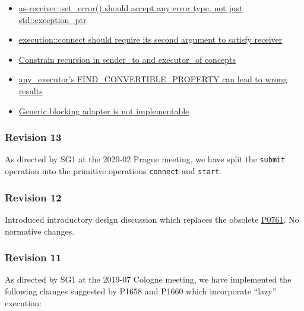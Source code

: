 \documentclass[a4paper,12pt,notitlepage,twoside,openright]{article}
\begin{document}
\begin{itemize}

\item
  \href{https://github.com/executors/executors/issues/462}{as-receiver::set\_error()
  should accept any error type, not just std::exception\_ptr}
\item
  \href{https://github.com/executors/executors/issues/473}{execution::connect
  should require its second argument to satisfy receiver}
\item
  \href{https://github.com/executors/executors/issues/474}{Constrain
  recursion in sender\_to and executor\_of concepts}
\item
  \href{https://github.com/executors/executors/issues/508}{any\_executor's
  FIND\_CONVERTIBLE\_PROPERTY can lead to wrong results}
\item
  \href{https://github.com/executors/executors/issues/512}{Generic
  blocking adapter is not implementable}
\end{itemize}

\hypertarget{revision-13}{%
\subsubsection{Revision 13}\label{revision-13}}

As directed by SG1 at the 2020-02 Prague meeting, we have split the
\texttt{submit} operation into the primitive operations
\texttt{connect} and \texttt{start}.

\hypertarget{revision-12}{%
\subsubsection{Revision 12}\label{revision-12}}

Introduced introductory design discussion which replaces the obsolete
\href{https://wg21.link/P0761}{P0761}. No normative changes.

\hypertarget{revision-11}{%
\subsubsection{Revision 11}\label{revision-11}}

As directed by SG1 at the 2019-07 Cologne meeting, we have implemented
the following changes suggested by P1658 and P1660 which incorporate
``lazy'' execution:
\end{document}

